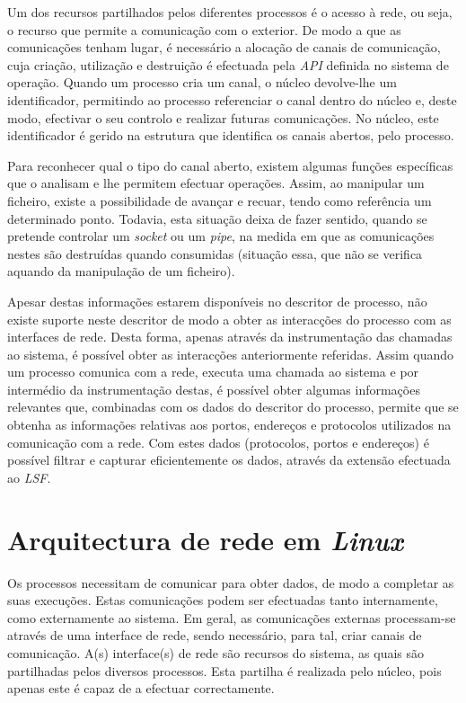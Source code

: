 Um dos recursos partilhados pelos diferentes processos é o acesso à rede, ou seja, o recurso que permite a comunicação com o exterior.
De modo a que as comunicações tenham lugar, é necessário a alocação de canais de comunicação, cuja criação, utilização e destruição é efectuada pela \textit{API} definida no sistema de operação.
Quando um processo cria um canal, o núcleo devolve-lhe um identificador, permitindo ao processo referenciar o canal dentro do núcleo e, deste modo, efectivar o seu controlo e realizar futuras comunicações.
No núcleo, este identificador é gerido na estrutura que identifica os canais abertos, pelo processo.

Para reconhecer qual o tipo do canal aberto, existem algumas funções específicas que o analisam e lhe permitem efectuar operações.
Assim, ao manipular um ficheiro, existe a possibilidade de avançar e recuar, tendo como referência um determinado ponto.
Todavia, esta situação deixa de fazer sentido, quando se pretende controlar um \textit{socket} ou um \textit{pipe}, na medida em que as comunicações nestes são destruídas quando consumidas (situação essa, que não se verifica aquando da manipulação de um ficheiro).

Apesar destas informações estarem disponíveis no descritor de processo, não existe suporte neste descritor de modo a obter as interacções do processo com as interfaces de rede.
Desta forma, apenas através da instrumentação das chamadas ao sistema, é possível obter as interacções anteriormente referidas.
Assim quando um processo comunica com a rede, executa uma chamada ao sistema e por intermédio da instrumentação destas, é possível obter algumas informações relevantes que, combinadas com os dados do descritor do processo, permite que se obtenha as informações relativas aos portos, endereços e protocolos utilizados na comunicação com a rede.
Com estes dados (protocolos, portos e endereços) é possível filtrar e capturar eficientemente os dados, através da extensão efectuada ao \textit{LSF}.

\section{Arquitectura de rede em \textit{Linux}}
\label{sub:network}

Os processos necessitam de comunicar para obter dados, de modo a completar as suas execuções.
Estas comunicações podem ser efectuadas tanto internamente, como externamente ao sistema.
Em geral, as comunicações externas processam-se através de uma interface de rede, sendo necessário, para tal, criar canais de comunicação.
A(s) interface(s) de rede são recursos do sistema, as quais são partilhadas pelos diversos processos.
Esta partilha é realizada pelo núcleo, pois apenas este é capaz de a efectuar correctamente.

